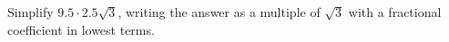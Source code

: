 Simplify $9.5\cdot2.5\sqrt3$, writing the answer as a multiple of $\sqrt3$ with a fractional coefficient in lowest terms.
